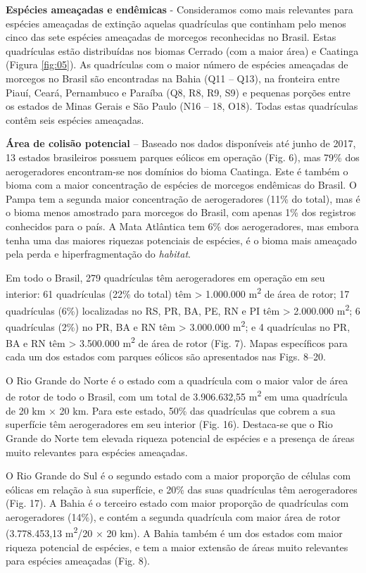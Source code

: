 \documentclass[
  oneside]{scrbook}
\begin{document}
\textbf{Espécies ameaçadas e endêmicas} - Consideramos como mais relevantes para espécies ameaçadas de extinção aquelas quadrículas que continham pelo menos cinco das sete espécies ameaçadas de morcegos reconhecidas no Brasil. Estas quadrículas estão distribuídas nos biomas Cerrado (com a maior área) e Caatinga (Figura \ref{fig:05}). As quadrículas com o maior número de espécies ameaçadas de morcegos no Brasil são encontradas na Bahia (Q11 -- Q13), na fronteira entre Piauí, Ceará, Pernambuco e Paraíba (Q8, R8, R9, S9) e pequenas porções entre os estados de Minas Gerais e São Paulo (N16 -- 18, O18). Todas estas quadrículas contêm seis espécies ameaçadas.

\textbf{Área de colisão potencial} -- Baseado nos dados disponíveis até junho de 2017, 13 estados brasileiros possuem parques eólicos em operação (Fig. 6), mas 79\% dos aerogeradores encontram-se nos domínios do bioma Caatinga. Este é também o bioma com a maior concentração de espécies de morcegos endêmicas do Brasil. O Pampa tem a segunda maior concentração de aerogeradores (11\% do total), mas é o bioma menos amostrado para morcegos do Brasil, com apenas 1\% dos registros conhecidos para o país. A Mata Atlântica tem 6\% dos aerogeradores, mas embora tenha uma das maiores riquezas potenciais de espécies, é o bioma mais ameaçado pela perda e hiperfragmentação do \emph{habitat}.

Em todo o Brasil, 279 quadrículas têm aerogeradores em operação em seu interior: 61 quadrículas (22\% do total) têm \textgreater{} 1.000.000 m\textsuperscript{2} de área de rotor; 17 quadrículas (6\%) localizadas no RS, PR, BA, PE, RN e PI têm \textgreater{} 2.000.000 m\textsuperscript{2}; 6 quadrículas (2\%) no PR, BA e RN têm \textgreater{} 3.000.000 m\textsuperscript{2}; e 4 quadrículas no PR, BA e RN têm \textgreater{} 3.500.000 m\textsuperscript{2} de área de rotor (Fig. 7). Mapas específicos para cada um dos estados com parques eólicos são apresentados nas Figs. 8--20.

O Rio Grande do Norte é o estado com a quadrícula com o maior valor de área de rotor de todo o Brasil, com um total de 3.906.632,55 m\textsuperscript{2} em uma quadrícula de 20 km × 20 km. Para este estado, 50\% das quadrículas que cobrem a sua superfície têm aerogeradores em seu interior (Fig. 16). Destaca-se que o Rio Grande do Norte tem elevada riqueza potencial de espécies e a presença de áreas muito relevantes para espécies ameaçadas.

O Rio Grande do Sul é o segundo estado com a maior proporção de células com eólicas em relação à sua superfície, e 20\% das suas quadrículas têm aerogeradores (Fig. 17). A Bahia é o terceiro estado com maior proporção de quadrículas com aerogeradores (14\%), e contém a segunda quadrícula com maior área de rotor (3.778.453,13 m\textsuperscript{2}/20 × 20 km). A Bahia também é um dos estados com maior riqueza potencial de espécies, e tem a maior extensão de áreas muito relevantes para espécies ameaçadas (Fig. 8).
\end{document}
